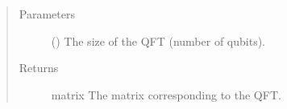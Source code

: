 \documentclass[letterpaper,10pt,english]{sphinxmanual}
\begin{document}
\begin{fulllineitems}
\begin{description}
\end{description}
\begin{quote}\begin{description}
\item[{Parameters}] \leavevmode
{} () \textendash{} The size of the QFT (number of qubits).

\item[{Returns}] \leavevmode
matrix \textendash{} The matrix corresponding to the QFT.

\end{description}\end{quote}

\end{fulllineitems}

\end{document}
